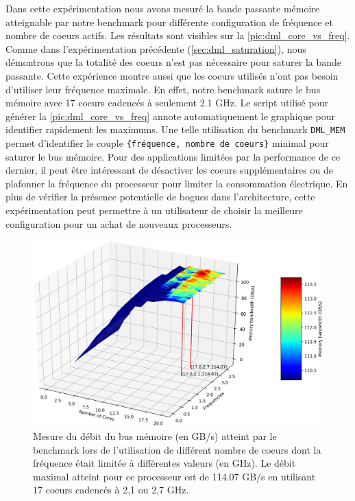     Dans cette expérimentation nous avons mesuré la bande passante mémoire atteignable par notre benchmark pour différente configuration de fréquence et nombre de coeurs actifs. Les résultats sont visibles sur la \autoref{pic:dml_core_vs_freq}. Comme dans l'expérimentation précédente (\autoref{sec:dml_saturation}), nous démontrons que la totalité des coeurs n'est pas nécessaire pour saturer la bande passante. Cette expérience montre aussi que les coeurs utilisés n'ont pas besoin d'utiliser leur fréquence maximale. En effet, notre benchmark sature le bus mémoire avec 17 coeurs cadencés à seulement 2.1 GHz. Le script utilisé pour générer la \autoref{pic:dml_core_vs_freq} annote automatiquement le graphique pour identifier rapidement les maximums. Une telle utilisation du benchmark \verb=DML_MEM= permet d'identifier le couple  \verb|{fréquence, nombre de coeurs}| minimal pour saturer le bus mémoire. Pour des applications limitées par la performance de ce dernier, il peut être intéressant de désactiver les coeurs supplémentaires ou de plafonner la fréquence du processeur pour limiter la consommation électrique. En plus de vérifier la présence potentielle de bogues dans l'architecture, cette expérimentation peut permettre à un utilisateur de choisir la meilleure configuration pour un achat de nouveaux processeurs. 
    
    \begin{figure}[h!]
    \center
    \includegraphics[width=14cm]{images/dml_core_vs_freq.png}
    \caption{\label{pic:dml_core_vs_freq}  Mesure du débit du bus mémoire (en GB/s) atteint par le benchmark lors de l'utilisation de différent nombre de coeurs dont la fréquence était limitée à différentes valeurs (en GHz). Le débit maximal atteint pour ce processeur est de 114.07 GB/s en utilisant 17 coeurs cadencés à 2,1 ou 2,7 GHz.}
    \end{figure}
    


